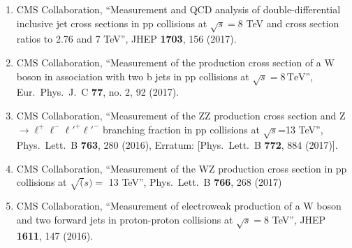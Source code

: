 \begin{itemize}
\begin{enumerate}
\item CMS Collaboration, ``Measurement and QCD analysis of double-differential inclusive jet cross sections in pp collisions at $ \sqrt{s}=8 $ TeV and cross section ratios to 2.76 and 7 TeV'', JHEP {\bf 1703}, 156 (2017).

\item CMS Collaboration, ``Measurement of the production cross section of a W boson in association with two b jets in pp collisions at $\sqrt{s} = 8{\,\mathrm{{TeV}}} $'', Eur.\ Phys.\ J.\ C {\bf 77}, no. 2, 92 (2017).

\item CMS Collaboration, ``Measurement of the ZZ production cross section and Z $\to \ell^+\ell^-\ell'^+\ell'^-$ branching fraction in pp collisions at $\sqrt s$=13 TeV'', Phys.\ Lett.\ B {\bf 763}, 280 (2016), Erratum: [Phys.\ Lett.\ B {\bf 772}, 884 (2017)].

\item CMS Collaboration, ``Measurement of the WZ production cross section in pp collisions at $\sqrt(s) =$ 13 TeV'', Phys.\ Lett.\ B {\bf 766}, 268 (2017)

\item CMS Collaboration, ``Measurement of electroweak production of a W boson and two forward jets in proton-proton collisions at $ \sqrt{s}=8 $ TeV'', JHEP {\bf 1611}, 147 (2016).


\end{enumerate}
\end{itemize}

